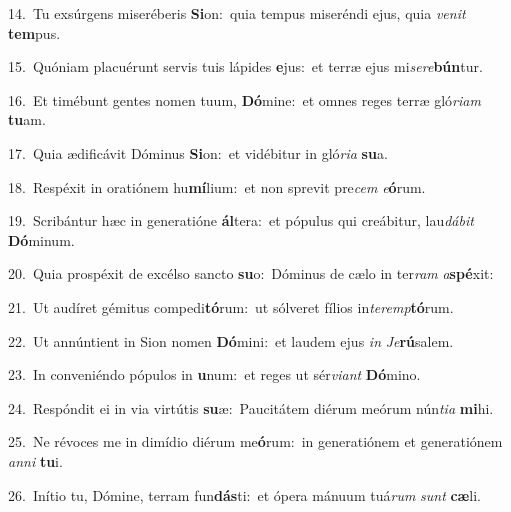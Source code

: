 {\numbfont\textcolor{\numbcolor}{14.}}~Tu exsúrgens miseréberis \textbf{Si}\-on:~\star quia tempus miseréndi ejus, quia \textit{ve}\-\textit{nit} \textbf{tem}\-pus.\par
{\numbfont\textcolor{\numbcolor}{15.}}~Quóniam placuérunt servis tuis lápides \textbf{e}\-jus:~\star et terræ ejus mi\-\textit{se}\-\textit{re}\textbf{bún}tur.\par
{\numbfont\textcolor{\numbcolor}{16.}}~Et timébunt gentes nomen tuum, \textbf{Dó}\-mine:~\star et omnes reges terræ gló\-\textit{ri}\-\textit{am} \textbf{tu}\-am.\par
{\numbfont\textcolor{\numbcolor}{17.}}~Quia ædificávit Dóminus \textbf{Si}\-on:~\star et vidébitur in gló\-\textit{ri}\-\textit{a} \textbf{su}\-a.\par
{\numbfont\textcolor{\numbcolor}{18.}}~Respéxit in oratiónem hu\-\textbf{mí}\-lium:~\star et non sprevit pre\textit{cem} \textit{e}\-\textbf{ó}rum.\par
{\numbfont\textcolor{\numbcolor}{19.}}~Scribántur hæc in generatióne \textbf{ál}\-tera:~\star et pópulus qui creábitur, lau\-\textit{dá}\-\textit{bit} \textbf{Dó}\-minum.\par
{\numbfont\textcolor{\numbcolor}{20.}}~Quia prospéxit de excélso sancto \textbf{su}\-o:~\star Dóminus de cælo in ter\textit{ram} \textit{a}\-\textbf{spé}xit:\par
{\numbfont\textcolor{\numbcolor}{21.}}~Ut audíret gémitus compedi\-\textbf{tó}\-rum:~\star ut sólveret fílios in\-\textit{ter}\-\textit{emp}\textbf{tó}rum.\par
{\numbfont\textcolor{\numbcolor}{22.}}~Ut annúntient in Sion nomen \textbf{Dó}\-mini:~\star et laudem ejus \textit{in} \textit{Je}\-\textbf{rú}salem.\par
{\numbfont\textcolor{\numbcolor}{23.}}~In conveniéndo pópulos in \textbf{u}\-num:~\star et reges ut sér\-\textit{vi}\-\textit{ant} \textbf{Dó}\-mino.\par
{\numbfont\textcolor{\numbcolor}{24.}}~Respóndit ei in via virtútis \textbf{su}\-æ:~\star Paucitátem diérum meórum nún\-\textit{ti}\-\textit{a} \textbf{mi}\-hi.\par
{\numbfont\textcolor{\numbcolor}{25.}}~Ne révoces me in dimídio diérum me\-\textbf{ó}\-rum:~\star in generatiónem et generatiónem \textit{an}\-\textit{ni} \textbf{tu}\-i.\par
{\numbfont\textcolor{\numbcolor}{26.}}~Inítio tu, Dómine, terram fun\-\textbf{dás}\-ti:~\star et ópera mánuum tuá\textit{rum} \textit{sunt} \textbf{cæ}\-li.\par
